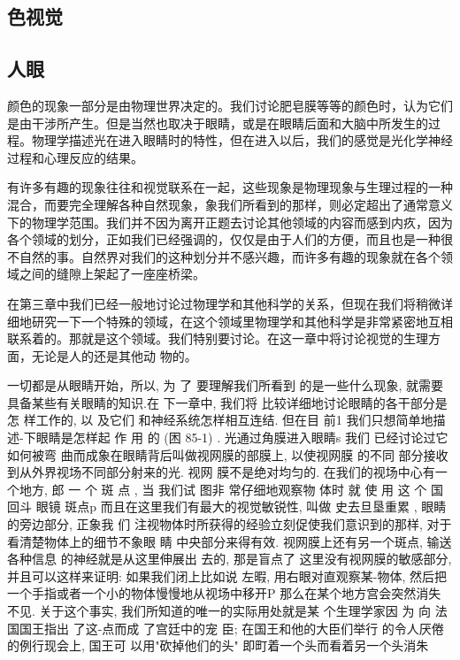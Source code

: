 \documentclass[11pt,oneside]{book}
\begin{document}
\begin{common-format}
\mainmatter

\chapter{色视觉}

\section{人眼}
颜色的现象一部分是由物理世界决定的。我们讨论肥皂膜等等的颜色时，认为它们是由干涉所产生。但是当然也取决于眼睛，或是在眼睛后面和大脑中所发生的过程。物理学描述光在进入眼睛时的特性，但在进入以后，我们的感觉是光化学神经过程和心理反应的结果。

有许多有趣的现象往往和视觉联系在一起，这些现象是物理现象与生理过程的一种混合，而要完全理解各种自然现象，象我们所看到的那样，则必定超出了通常意义下的物理学范围。我们并不因为离开正题去讨论其他领域的内容而感到内疚，因为各个领域的划分，正如我们已经强调的，仅仅是由于人们的方便，而且也是一种很不自然的事。自然界对我们的这种划分并不感兴趣，而许多有趣的现象就在各个领域之间的缝隙上架起了一座座桥梁。

在第三章中我们已经一般地讨论过物理学和其他科学的关系，但现在我们将稍微详细地研究一下一个特殊的领域，在这个领域里物理学和其他科学是非常紧密地互相联系着的。那就是这个领域。我们特别要讨论。在这一章中将讨论视觉的生理方面，无论是人的还是其他动 物的。

一切都是从眼睛开始，所以, 为 了 要理解我们所看到
的是一些什么现象, 就需要具备某些有关眼睛的知识.在
下一章中, 我们将 比较详细地讨论眼睛的各干部分是怎
样工作的, 以 及它们 和神经系统怎样相互连结.
但在目
前1 我们只想简单地描述-下眼睛是怎样起 作 用 的 (困
85-1) .
光通过角膜进入眼睛s 我们 已经讨论过它如何被弯
曲而成象在眼睛背后叫做视网膜的部膜上, 以使视网膜
的不同 部分接收到从外界视场不同部分射来的光. 视网
膜不是绝对均匀的. 在我们的视场中心有一个地方, 郎 一
个 斑 点 , 当 我们试 图非 常仔细地观察物 体时 就 使 用 这 个
国 回斗
眼镜
斑点p 而且在这里我们有最大的视觉敏锐性, 叫做 史去旦垦重累 , 眼睛的旁边部分, 正象我
们 注视物体时所获得的经验立刻促使我们意识到的那样, 对于看清楚物体上的细节不象眼
睛 中央部分来得有效.
视网膜上还有另一个斑点, 输送各种信息 的神经就是从这里伸展出
去的, 那是盲点了 这里没有视网膜的敏感部分, 并且可以这样来证明: 如果我们闭上比如说
左暇, 用右眼对直观察某-物体, 然后把一个手指或者一个小的物体慢慢地从视场中移开P
那么在某个地方宫会突然消失不见.
关于这个事实, 我们所知道的唯一的实际用处就是某
个生理学家因 为 向 法国国王指出 了这-点而成 了宫廷中的宠 臣; 在国王和他的大臣们举行
的令人厌倦的例行现会上, 国王可 以用"砍掉他们的头" 即町着一个头而看着另一个头消朱


\end{common-format}
\end{document}
